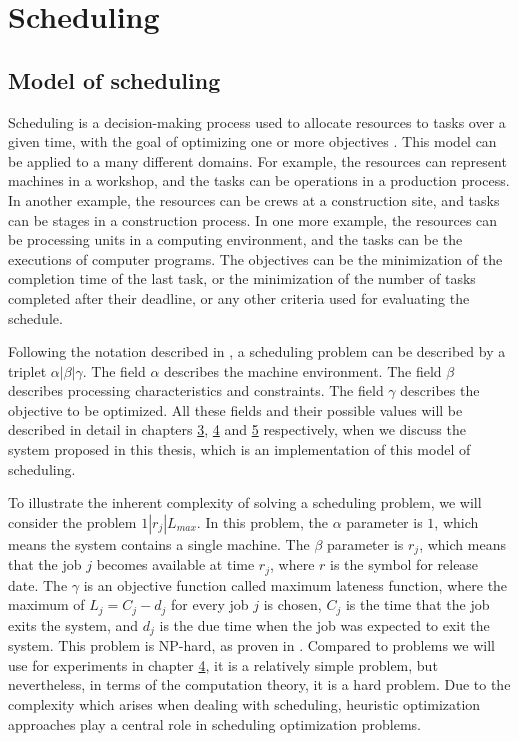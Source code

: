 \section{Scheduling}
\label{sec:scheduling}

\subsection{Model of scheduling}
\label{sec:model_of_scheduling}
Scheduling is a decision-making process used to allocate resources to tasks over a given time, with the goal of optimizing one or more objectives \citep{pinedo2016scheduling}. This model can be applied to a many different domains. For example, the resources can represent machines in a workshop, and the tasks can be operations in a production process. In another example, the resources can be crews at a construction site, and tasks can be stages in a construction process. In one more example, the resources can be processing units in a computing environment, and the tasks can be the executions of computer programs. The objectives can be the minimization of the completion time of the last task, or the minimization of the number of tasks completed after their deadline, or any other criteria used for evaluating the schedule.

Following the notation described in \citep{pinedo2016scheduling}, a scheduling problem can be described by a triplet $\alpha | \beta | \gamma$. The field $\alpha$ describes the machine environment. The field $\beta$ describes processing characteristics and constraints. The field $\gamma$ describes the objective to be optimized. All these fields and their possible values will be described in detail in chapters \hyperref[sec:topology_model]{3}, \hyperref[sec:events_model]{4} and \hyperref[sec:evaluation_model]{5} respectively, when we discuss the system proposed in this thesis, which is an implementation of this model of scheduling.

To illustrate the inherent complexity of solving a scheduling problem, we will consider the problem $1|r_j|L_{max}$. In this problem, the $\alpha$ parameter is $1$, which means the system contains a single machine. The $\beta$ parameter is $r_j$, which means that the job $j$ becomes available at time $r_j$, where $r$ is the symbol for release date. The $\gamma$ is an objective function called maximum lateness function, where the maximum of $L_j = C_j - d_j$ for every job $j$ is chosen, $C_j$ is the time that the job exits the system, and $d_j$ is the due time when the job was expected to exit the system. This problem is NP-hard, as proven in \citep{pinedo2016scheduling}. Compared to problems we will use for experiments in chapter \hyperref[sec:experiments_and_results]{4}, it is a relatively simple problem, but nevertheless, in terms of the computation theory, it is a hard problem. Due to the complexity which arises when dealing with scheduling, heuristic optimization approaches play a central role in scheduling optimization problems.

